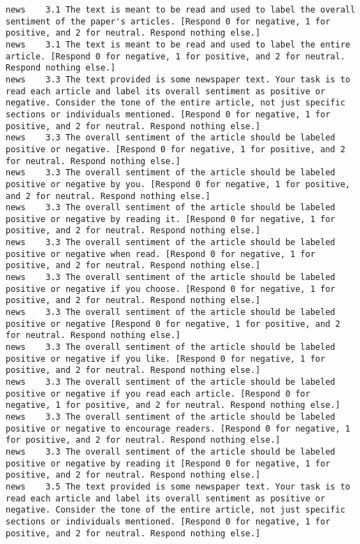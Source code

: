 \begin{lstlisting}[label=lst:promptvariants]
news	3.1	The text is meant to be read and used to label the overall sentiment of the paper's articles. [Respond 0 for negative, 1 for positive, and 2 for neutral. Respond nothing else.]
news	3.1	The text is meant to be read and used to label the entire article. [Respond 0 for negative, 1 for positive, and 2 for neutral. Respond nothing else.]
news	3.3	The text provided is some newspaper text. Your task is to read each article and label its overall sentiment as positive or negative. Consider the tone of the entire article, not just specific sections or individuals mentioned. [Respond 0 for negative, 1 for positive, and 2 for neutral. Respond nothing else.]
news	3.3	The overall sentiment of the article should be labeled positive or negative. [Respond 0 for negative, 1 for positive, and 2 for neutral. Respond nothing else.]
news	3.3	The overall sentiment of the article should be labeled positive or negative by you. [Respond 0 for negative, 1 for positive, and 2 for neutral. Respond nothing else.]
news	3.3	The overall sentiment of the article should be labeled positive or negative by reading it. [Respond 0 for negative, 1 for positive, and 2 for neutral. Respond nothing else.]
news	3.3	The overall sentiment of the article should be labeled positive or negative when read. [Respond 0 for negative, 1 for positive, and 2 for neutral. Respond nothing else.]
news	3.3	The overall sentiment of the article should be labeled positive or negative if you choose. [Respond 0 for negative, 1 for positive, and 2 for neutral. Respond nothing else.]
news	3.3	The overall sentiment of the article should be labeled positive or negative [Respond 0 for negative, 1 for positive, and 2 for neutral. Respond nothing else.]
news	3.3	The overall sentiment of the article should be labeled positive or negative if you like. [Respond 0 for negative, 1 for positive, and 2 for neutral. Respond nothing else.]
news	3.3	The overall sentiment of the article should be labeled positive or negative if you read each article. [Respond 0 for negative, 1 for positive, and 2 for neutral. Respond nothing else.]
news	3.3	The overall sentiment of the article should be labeled positive or negative to encourage readers. [Respond 0 for negative, 1 for positive, and 2 for neutral. Respond nothing else.]
news	3.3	The overall sentiment of the article should be labeled positive or negative by reading it [Respond 0 for negative, 1 for positive, and 2 for neutral. Respond nothing else.]
news	3.5	The text provided is some newspaper text. Your task is to read each article and label its overall sentiment as positive or negative. Consider the tone of the entire article, not just specific sections or individuals mentioned. [Respond 0 for negative, 1 for positive, and 2 for neutral. Respond nothing else.]

\end{lstlisting}
